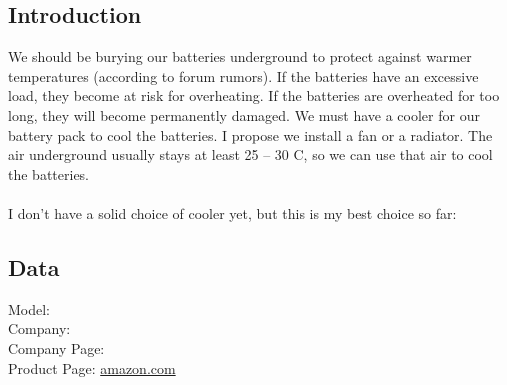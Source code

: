 \subsection{Introduction}

We should be burying our batteries underground to protect against warmer temperatures (according to forum rumors). If the batteries have an excessive load, they become at risk for overheating. If the batteries are overheated for too long, they will become permanently damaged. We must have a cooler for our battery pack to cool the batteries. I propose we install a fan or a radiator. The air underground usually stays at least 25 – 30 C, so we can use that air to cool the batteries. \\
 \\
I don’t have a solid choice of cooler yet, but this is my best choice so far: \\
\subsection{Data}
Model: \\
Company: \\
Company Page: \\
Product Page: \href{https://www.amazon.com/Performance-Electric-Radiator-Mounting-%EF%BC%88Diameter/dp/B01N0686K5/ref=asc_df_B01N0686K5/?tag=hyprod-20&linkCode=df0&hvadid=241994092016&hvpos=1o4&hvnetw=g&hvrand=169244523548284450&hvpone=&hvptwo=&hvqmt=&hvdev=c&hvdvcmdl=&hvlocint=&hvlocphy=9061320&hvtargid=pla-449411562922&psc=1}{amazon.com}


